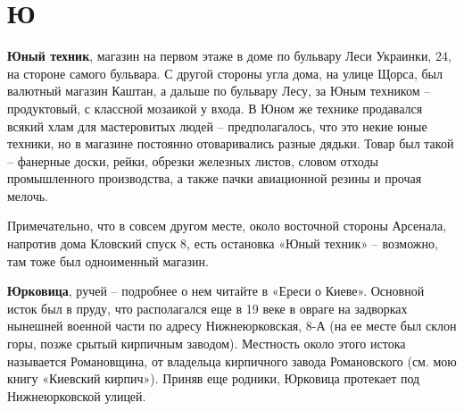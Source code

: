 \chapter*{Ю}


\textbf{Юный техник}, магазин на первом этаже в доме по бульвару Леси Украинки, 24, на стороне самого бульвара. С другой стороны угла дома, на улице Щорса, был валютный магазин Каштан, а дальше по бульвару Лесу, за Юным техником – продуктовый, с классной мозаикой у входа. В Юном же технике продавался всякий хлам для мастеровитых людей – предполагалось, что это некие юные техники, но в магазине постоянно отоваривались разные дядьки. Товар был такой – фанерные доски, рейки, обрезки железных листов, словом отходы промышленного производства, а также пачки авиационной резины и прочая мелочь.

Примечательно, что в совсем другом месте, около восточной стороны Арсенала, напротив дома Кловский спуск 8, есть остановка «Юный техник» – возможно, там тоже был одноименный магазин.\\

\medskip

\textbf{Юрковица}, ручей – подробнее о нем читайте в «Ереси о Киеве». Основной исток был в пруду, что располагался еще в 19 веке в овраге на задворках нынешней военной части по адресу Нижнеюрковская, 8-А (на ее месте был склон горы, позже срытый кирпичным заводом). Местность около этого истока называется Романовщина, от владельца кирпичного завода Романовского (см. мою книгу «Киевский кирпич»). Приняв еще родники, Юрковица протекает под Нижнеюрковской улицей.
